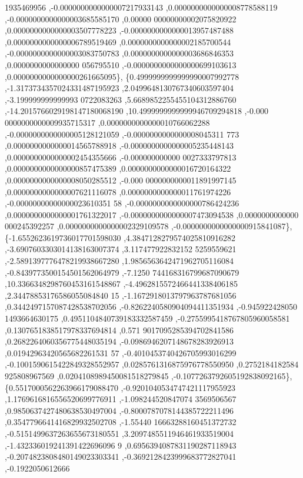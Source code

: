 \begin{DoxyCode}
      1935469956 ,-0.0000000000000007217933143 ,0.0000000000000008778588119 ,-0.0000000000000003685585170 ,0.00000
      00000000002075820922 ,0.0000000000000003507778223 ,-0.0000000000000013957487488 ,0.0000000000000006789519469
       ,0.0000000000000002185700544 ,-0.0000000000000003083750783 ,0.0000000000000003686846353 ,0.0000000000000000
      056795510 ,-0.0000000000000000699103613 ,0.0000000000000000261665095\},
\{0.4999999999999990007992778 ,-1.3173734357024331487195923 ,2.0499648130767340603597404 ,-3.199999999999993
      0722083263 ,5.6689852255455104312886760 ,-14.2015766029198147180068190 ,10.4999999999999946709294818 ,-0.000
      0000000000009935715317 ,0.0000000000000010766062288 ,-0.0000000000000005128121059 ,-0.0000000000000008045311
      773 ,0.0000000000000014565788918 ,-0.0000000000000005235448143 ,0.0000000000000002454355666 ,-0.000000000000
      0027333797813 ,0.0000000000000000857475389 ,0.0000000000000016720164322 ,0.0000000000000008050285512 ,-0.000
      0000000000011891997145 ,0.0000000000000007621116078 ,0.0000000000000011761974226 ,-0.00000000000000023610351
      58 ,-0.0000000000000000786424236 ,0.0000000000000001761322017 ,-0.0000000000000007473094538 ,0.0000000000000
      000245392257 ,0.0000000000000002329109578 ,-0.0000000000000000915841087\},
\{-1.6552623619736017701598030 ,4.3847128279574025810916282 ,-3.6907603303014138163007374 ,3.117477922832152
      5259559621 ,-2.5891397776478219938667280 ,1.9856563642471962705116084 ,-0.8439773500154501562064979 ,-7.1250
      744168316799687090679 ,10.3366348298760453161548867 ,-4.4962815572466441338406185 ,2.34478853176586055084840
      15 ,-1.1672918013797963787681056 ,0.3442497157087428538702056 ,-0.8262240580904094411351934 ,-0.945922428050
      1493664630175 ,0.4951104840739183332587459 ,-0.2755995418767805960058581 ,0.1307651838517978337694814 ,0.571
      9017095285394702841586 ,0.2682264060356775448035194 ,-0.0986946207148678283926913 ,0.01942963420565682261531
      57 ,-0.4010453740426705993016299 ,-0.1001590615422849328552957 ,0.0285761316875976778550950 ,0.2752184182584
      925808967569 ,0.0204108989450081518279845 ,-0.1077263792605192838092165\},
\{0.5517000562263966179088470 ,-0.9201040534747421117955923 ,1.1769616816556520699776911 ,-1.098244520847074
      3569506567 ,0.9850637427480638530497004 ,-0.8000787078144385722211496 ,0.3547796641416829932502708 ,-1.55440
      16663288160451372732 ,-0.5151499637263655673180551 ,3.2097485511946461933519004 ,-1.432336019241391422696096
      9 ,0.6956394087831190287118943 ,-0.2074823808480149023303341 ,-0.3692128423999683772827041 ,-0.1922050612666

\end{DoxyCode}
